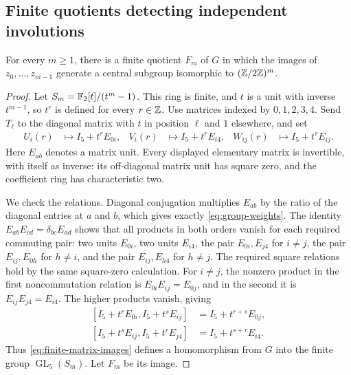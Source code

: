 \subsection{Finite quotients detecting independent involutions}

\begin{lemma}
\label{lem:finite-central-quotients}
For every $m\geq1$, there is a finite quotient $F_m$ of $G$ in which
the images of $z_0,\ldots,z_{m-1}$ generate a central subgroup
isomorphic to $(\mathbb Z/2\mathbb Z)^m$.
\end{lemma}

\begin{proof}
Let $S_m=\mathbb F_2[t]/(t^m-1)$.  This ring is finite, and $t$ is a unit
with inverse $t^{m-1}$, so $t^r$ is defined for every $r\in\mathbb Z$.
Use matrices indexed by $0,1,2,3,4$.  Send $T_\ell$ to the diagonal
matrix with $t$ in position $\ell$ and $1$ elsewhere, and set
\begin{equation}
\begin{aligned}
 U_i(r)&\longmapsto I_5+t^rE_{0i},&
 V_i(r)&\longmapsto I_5+t^rE_{i4},&
 W_{ij}(r)&\longmapsto I_5+t^rE_{ij}.
\end{aligned}
\label{eq:finite-matrix-images}
\end{equation}
Here $E_{ab}$ denotes a matrix unit.  Every displayed elementary
matrix is invertible, with itself as inverse: its off-diagonal
matrix unit has square zero, and the coefficient ring has
characteristic two.

We check the relations.  Diagonal conjugation multiplies $E_{ab}$
by the ratio of the diagonal entries at $a$ and $b$, which gives
exactly \eqref{eq:group-weights}.  The identity
$E_{ab}E_{cd}=\delta_{bc}E_{ad}$ shows that all products in both
orders vanish for each required commuting pair: two units $E_{0i}$,
two units $E_{i4}$, the pair $E_{0i},E_{j4}$ for $i\neq j$, the pair
$E_{ij},E_{0h}$ for $h\neq i$, and the pair $E_{ij},E_{h4}$ for
$h\neq j$.  The required square relations hold by the same
square-zero calculation.  For $i\neq j$, the nonzero product in the
first noncommutation relation is $E_{0i}E_{ij}=E_{0j}$, and in the
second it is $E_{ij}E_{j4}=E_{i4}$.  The higher products vanish,
giving
\[
\begin{aligned}
 [I_5+t^rE_{0i},I_5+t^sE_{ij}]&=I_5+t^{r+s}E_{0j},\\
 [I_5+t^sE_{ij},I_5+t^rE_{j4}]&=I_5+t^{s+r}E_{i4}.
\end{aligned}
\]
Thus \eqref{eq:finite-matrix-images} defines a homomorphism from
$G$ into the finite group $\operatorname{GL}_5(S_m)$.  Let $F_m$
be its image.


\end{proof}
